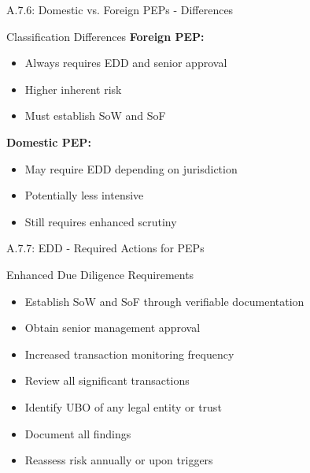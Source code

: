 \documentclass{beamer}
\begin{document}
	\begin{frame}{A.7.6: Domestic vs. Foreign PEPs - Differences}
		\begin{block}{Classification Differences}
			\textbf{Foreign PEP:}
			\begin{itemize}
				\item Always requires EDD and senior approval
				\item Higher inherent risk
				\item Must establish SoW and SoF
			\end{itemize}
			\textbf{Domestic PEP:}
			\begin{itemize}
				\item May require EDD depending on jurisdiction
				\item Potentially less intensive
				\item Still requires enhanced scrutiny
			\end{itemize}
		\end{block}
	\end{frame}
	
	\begin{frame}{A.7.7: EDD - Required Actions for PEPs}
		\begin{block}{Enhanced Due Diligence Requirements}
			\begin{itemize}
				\item Establish SoW and SoF through verifiable documentation
				\item Obtain senior management approval
				\item Increased transaction monitoring frequency
				\item Review all significant transactions
				\item Identify UBO of any legal entity or trust
				\item Document all findings
				\item Reassess risk annually or upon triggers
			\end{itemize}
		\end{block}
	\end{frame}
	
	
\end{document}
